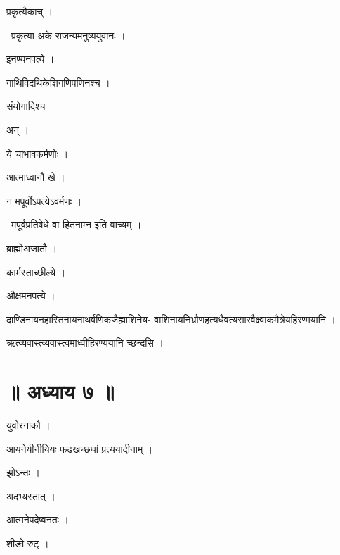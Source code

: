 \documentclass[10pt, openany, oneside]{book}
\begin{document}
\noindent प्रकृत्यैकाच् ।

\par\noindent\hspace{1.5em}{\vps वा॰}~{\qt प्रकृत्या अके राजन्यमनुष्ययुवानः ।}

\noindent इनण्यनपत्ये ।

\noindent गाथिविदथिकेशिगणिपणिनश्च ।

\noindent संयोगादिश्च ।

\noindent अन् ।

\noindent ये चाभावकर्मणोः ।

\noindent आत्माध्वानौ खे ।

\noindent न मपूर्वोऽपत्येऽवर्मणः ।

\par\noindent\hspace{1.5em}{\vps वा॰}~{\qt मपूर्वप्रतिषेधे वा हितनाम्न इति वाच्यम् ।}

\noindent ब्राह्मोअजातौ ।

\noindent कार्मस्ताच्छील्ये ।

\noindent औक्षमनपत्ये ।

\noindent दाण्डिनायनहास्तिनायनाथर्वणिकजैह्माशिनेय- वाशिनायनिभ्रौणहत्यधैवत्यसारवैक्ष्वाकमैत्रेयहिरण्मयानि ।

\noindent ऋत्व्यवास्त्व्यवास्त्वमाध्वीहिरण्ययानि च्छन्दसि ।

\section*{॥ अध्याय ७ ॥}

\noindent युवोरनाकौ ।

\noindent आयनेयीनीयियः फढखच्छघां प्रत्ययादीनाम् ।

\noindent झोऽन्तः ।

\noindent अदभ्यस्तात् ।

\noindent आत्मनेपदेष्वनतः ।

\noindent शीङो रुट् ।
\end{document}
